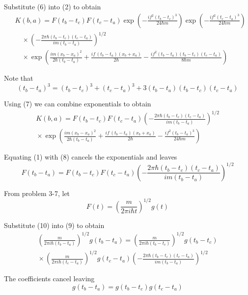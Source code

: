 \documentclass[12pt]{article}
\begin{document}
\bigskip
Substitute (6) into (2) to obtain
{\footnotesize
\begin{align*}
&K(b,a)=F(t_b-t_c)F(t_c-t_a)
\exp\left(-\frac{if^2(t_b-t_c)^3}{24\hbar m}\right)
\exp\left(-\frac{if^2(t_c-t_a)^3}{24\hbar m}\right)
\\
&\quad{}\times
\left(-\frac{2\pi\hbar(t_b-t_c)(t_c-t_a)}{im(t_b-t_a)}\right)^{1/2}
\\
&\quad{}\times
\exp\left(
\frac{im(x_b-x_a)^2}{2\hbar(t_b-t_a)}
+\frac{if\,(t_b-t_a)(x_b+x_a)}{2\hbar}
-\frac{if^2(t_b-t_a)(t_b-t_c)(t_c-t_a)}{8\hbar m}
\right)
\end{align*}
}

Note that
\begin{equation*}
(t_b-t_a)^3=(t_b-t_c)^3+(t_c-t_a)^3+3(t_b-t_a)(t_b-t_c)(t_c-t_a)
\tag{7}
\end{equation*}

Using (7) we can combine exponentials to obtain
\begin{multline*}
K(b,a)=F(t_b-t_c)F(t_c-t_a)
\left(-\frac{2\pi\hbar(t_b-t_c)(t_c-t_a)}{im(t_b-t_a)}\right)^{1/2}
\\
{}\times
\exp\left(
\frac{im(x_b-x_a)^2}{2\hbar(t_b-t_a)}
+\frac{if\,(t_b-t_a)(x_b+x_a)}{2\hbar}
-\frac{if^2(t_b-t_a)^3}{24\hbar m}
\right)
\tag{8}
\end{multline*}

Equating (1) with (8) cancels the exponentials and leaves
\begin{equation*}
F(t_b-t_a)=F(t_b-t_c)F(t_c-t_a)
\left(-\frac{2\pi\hbar(t_b-t_c)(t_c-t_a)}{im(t_b-t_a)}\right)^{1/2}
\tag{9}
\end{equation*}

From problem 3-7, let
\begin{equation*}
F(t)=\left(\frac{m}{2\pi i\hbar t}\right)^{1/2} g(t)
\tag{10}
\end{equation*}

Substitute (10) into (9) to obtain
\begin{multline*}
\left(\frac{m}{2\pi i\hbar(t_b-t_a)}\right)^{1/2} g(t_b-t_a)
=\left(\frac{m}{2\pi i\hbar(t_b-t_c)}\right)^{1/2} g(t_b-t_c)
\\
{}\times
\left(\frac{m}{2\pi i\hbar(t_c-t_a)}\right)^{1/2} g(t_c-t_a)
\left(-\frac{2\pi\hbar(t_b-t_c)(t_c-t_a)}{im(t_b-t_a)}\right)^{1/2}
\end{multline*}

The coefficients cancel leaving
\begin{equation*}
g(t_b-t_a)=g(t_b-t_c)g(t_c-t_a)
\tag{11}
\end{equation*}
\end{document}
